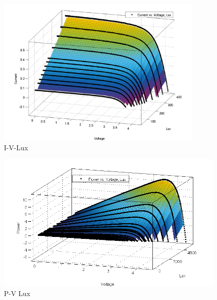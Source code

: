   \begin{figure}[H]
  \begin{center}
  \includegraphics[width=0.9\textwidth]{images/I-V-lux}
  \caption{I-V-Lux}
  \label{fig:IVgraph}
  \end{center}
  \end{figure}
    
\begin{figure}[H]
  \begin{center}
  \includegraphics[width=\textwidth]{images/PV_LUX}
  \caption{ P-V Lux}
  \label{fig:PVgraph}
  \end{center}
\end{figure}

